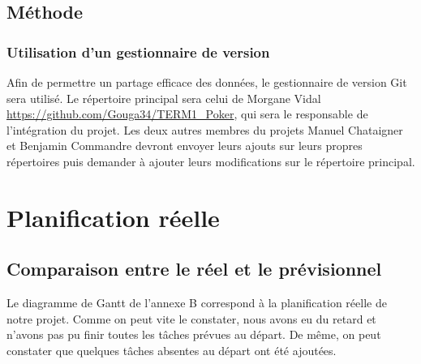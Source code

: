 \documentclass{report}
\begin{document}
\section{Méthode}
\subsection{Utilisation d'un gestionnaire de version}
\hspace{0.5cm}Afin de permettre un partage efficace des données, le gestionnaire de version Git sera utilisé. Le répertoire principal sera celui de Morgane Vidal \url{https://github.com/Gouga34/TERM1_Poker}, qui sera le responsable de l'intégration du projet. Les deux autres membres du projets Manuel Chataigner et Benjamin Commandre devront envoyer leurs ajouts sur leurs propres répertoires puis demander à ajouter leurs modifications sur le répertoire principal.\par

\chapter{Planification réelle}
\section{Comparaison entre le réel et le prévisionnel}
\hspace{0.5cm}Le diagramme de Gantt de l'annexe B correspond à la planification réelle de notre projet. Comme on peut vite le constater, nous avons eu du retard et n'avons pas pu finir toutes les tâches prévues au départ. De même, on peut constater que quelques tâches absentes au départ ont été ajoutées.\par
\end{document}
